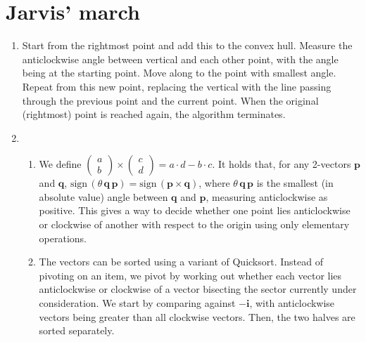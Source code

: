 \documentclass[11pt]{article}
\begin{document}
\section{Jarvis' march}
\begin{enumerate}
\item Start from the rightmost point and add this to the convex hull. Measure the anticlockwise angle between vertical and each other point, with the angle being at the starting point. Move along to the point with smallest angle. Repeat from this new point, replacing the vertical with the line passing through the previous point and the current point. When the original (rightmost) point is reached again, the algorithm terminates.
\item
  \begin{enumerate}
  \item We define \(\begin{pmatrix}a\\b\end{pmatrix}\times\begin{pmatrix}c\\d\end{pmatrix}=a\cdot d-b\cdot c\). It holds that, for any 2-vectors \(\mathbf p\) and \(\mathbf q\), \(\mathrm{sign}\,(\theta\,\mathbf q\,\mathbf p)=\mathrm{sign}\,(\mathbf p\times\mathbf q)\), where \(\theta\,\mathbf q\,\mathbf p\) is the smallest (in absolute value) angle between \(\mathbf q\) and \(\mathbf p\), measuring anticlockwise as positive. This gives a way to decide whether one point lies anticlockwise or clockwise of another with respect to the origin using only elementary operations.
  \item The vectors can be sorted using a variant of Quicksort. Instead of pivoting on an item, we pivot by working out whether each vector lies anticlockwise or clockwise of a vector bisecting the sector currently under consideration. We start by comparing against \(-\mathbf i\), with anticlockwise vectors being greater than all clockwise vectors. Then, the two halves are sorted separately.
  \end{enumerate}
\end{enumerate}
\end{document}
